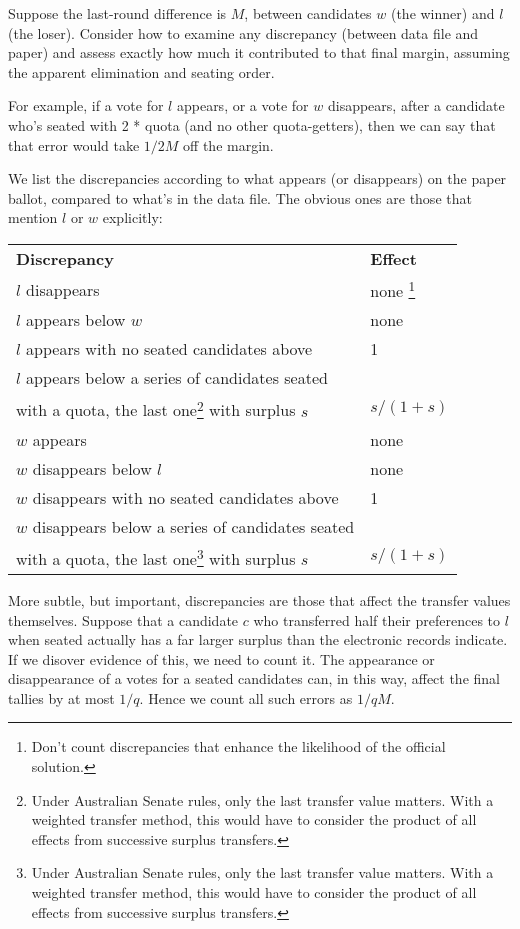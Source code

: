\documentclass[10pt,a4paper]{article}
\newcommand{\VTNote}[1]{}
\begin{document}
{Suppose the last-round difference is $M$, between candidates $w$ (the winner) and $l$ (the loser).  Consider how to examine any discrepancy (between data file and paper) and assess exactly how much it contributed to that final margin, assuming the apparent elimination and seating order.  

For example, if a vote for $l$ appears, or a vote for $w$ disappears, after a candidate who's seated with 2 * quota (and no other quota-getters), then we can say that that error would take $1/2M$ off the margin. 

We list the discrepancies according to what appears (or disappears) on the paper ballot, compared to what's in the data file.  The obvious ones are those that mention $l$ or $w$ explicitly:

\begin{tabular}{ll}
{\bf Discrepancy} & {\bf Effect} \\

$l$ disappears & none \footnote{Don't count discrepancies that enhance the likelihood of the official solution.}\\
$l$ appears below $w$ & none \\
$l$ appears with no seated candidates above & 1 \\
$l$ appears below a series of candidates seated & \\
 with a quota, the last one\footnote{Under Australian Senate rules, only the last transfer value matters.  With a weighted transfer method, this would have to consider the product of all effects from successive surplus transfers.} with surplus $s$ & $s/(1+s)$ \\
$w$ appears & none \\
$w$ disappears below $l$ & none \\
$w$ disappears with no seated candidates above & 1 \\
$w$ disappears below a series of candidates seated & \\
 with a quota, the last one\footnote{Under Australian Senate rules, only the last transfer value matters.  With a weighted transfer method, this would have to consider the product of all effects from successive surplus transfers.} with surplus $s$ & $s/(1+s)$
\end{tabular}

More subtle, but important, discrepancies are those that affect the transfer values themselves.  Suppose that a candidate $c$ who transferred half their preferences to $l$ when seated actually has a far larger surplus than the electronic records indicate.  If we disover evidence of this, we need to count it. The appearance or disappearance of a votes for a seated candidates can, in this way, affect the final tallies by at most $1/q$.  \VTNote{**Check.} Hence we count all such errors as $1/qM$.

}
\end{document}
